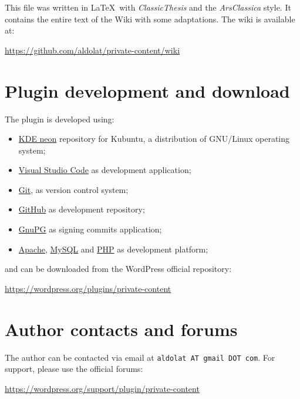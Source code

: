 \begingroup
	\footnotesize

	\noindent This file was written in \LaTeX~with \textit{ClassicThesis} and
	the \textit{ArsClassica} style. It contains the entire text of the Wiki with
	some adaptations. The wiki is available at:

	\begin{center}
		\url{https://github.com/aldolat/private-content/wiki}
	\end{center}

	\section*{Plugin development and download}

	\noindent The plugin is developed using:

	\begin{itemize}
		\item \href{https://neon.kde.org/}{KDE neon} repository for Kubuntu, a
		distribution of GNU/Linux operating system;
		\item \href{https://code.visualstudio.com}{Visual Studio Code} as
		development application;
		\item \href{https://git-scm.com}{Git}, as version control system;
		\item \href{https://github.com/aldolat/private-content}{GitHub} as
		development repository;
		\item \href{https://gnupg.org}{GnuPG} as signing commits application;
		\item \href{http://apache.org/}{Apache},
		\href{https://www.mysql.com/it/}{MySQL} and
		\href{https://www.php.net/}{PHP} as development platform;
	\end{itemize}

	\noindent and can be downloaded from the WordPress official repository:
	\begin{center}
	\url{https://wordpress.org/plugins/private-content}
	\end{center}

	\section*{Author contacts and forums}

	\noindent The author can be contacted via email at \texttt{aldolat AT gmail
	DOT com}.
	For support, please use the official forums:
	\begin{center}
	\url{https://wordpress.org/support/plugin/private-content}
	\end{center}

